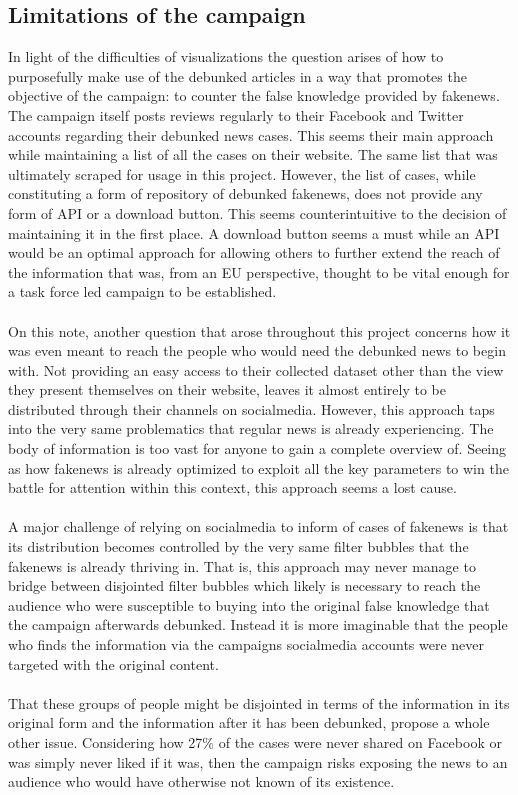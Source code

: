 \documentclass{article}
\begin{document}
\subsection{Limitations of the campaign}
In light of the difficulties of visualizations the question arises of how to purposefully make use of the debunked articles in a way that promotes the objective of the campaign: to counter the false knowledge provided by fakenews. The campaign itself posts reviews regularly to their Facebook and Twitter accounts regarding their debunked news cases. This seems their main approach while maintaining a list of all the cases on their website. The same list that was ultimately scraped for usage in this project. However, the list of cases, while constituting a form of repository of debunked fakenews, does not provide any form of API or a download button. This seems counterintuitive to the decision of maintaining it in the first place. A download button seems a must while an API would be an optimal approach for allowing others to further extend the reach of the information that was, from an EU perspective, thought to be vital enough for a task force led campaign to be established.
\\\\
On this note, another question that arose throughout this project concerns how it was even meant to reach the people who would need the debunked news to begin with. Not providing an easy access to their collected dataset other than the view they present themselves on their website, leaves it almost entirely to be distributed through their channels on socialmedia. However, this approach taps into the very same problematics that regular news is already experiencing. The body of information is too vast for anyone to gain a complete overview of. Seeing as how fakenews is already optimized to exploit all the key parameters to win the battle for attention within this context, this approach seems a lost cause.
\\\\
A major challenge of relying on socialmedia to inform of cases of fakenews is that its distribution becomes controlled by the very same filter bubbles that the fakenews is already thriving in. That is, this approach may never manage to bridge between disjointed filter bubbles which likely is necessary to reach the audience who were susceptible to buying into the original false knowledge that the campaign afterwards debunked. Instead it is more imaginable that the people who finds the information via the campaigns socialmedia accounts were never targeted with the original content.
\\\\
That these groups of people might be disjointed in terms of the information in its original form and the information after it has been debunked, propose a whole other issue. Considering how 27\% of the cases were never shared on Facebook or was simply never liked if it was, 
then the campaign risks exposing the news to an audience who would have otherwise not known of its existence.
\end{document}
